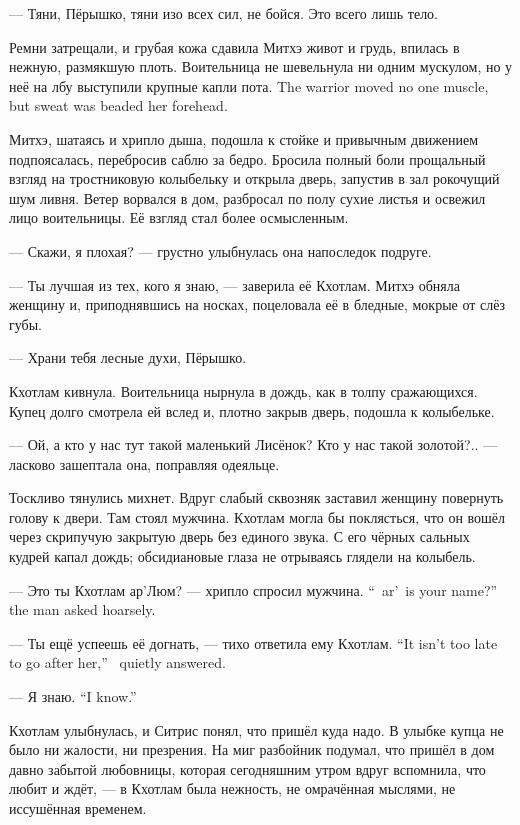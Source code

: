 --- Тяни, Пёрышко, тяни изо всех сил, не бойся.
Это всего лишь тело.

Ремни затрещали, и грубая кожа сдавила Митхэ живот и грудь, впилась в нежную, размякшую плоть.
{Воительница не шевельнула ни одним мускулом, но у неё на лбу выступили крупные капли пота.}
{The warrior moved no one muscle, but sweat was beaded her forehead.}

Митхэ, шатаясь и хрипло дыша, подошла к стойке и привычным движением подпоясалась, перебросив саблю за бедро.
Бросила полный боли прощальный взгляд на тростниковую колыбельку и открыла дверь, запустив в зал рокочущий шум ливня.
Ветер ворвался в дом, разбросал по полу сухие листья и освежил лицо воительницы.
Её взгляд стал более осмысленным.

--- Скажи, я плохая? --- грустно улыбнулась она напоследок подруге.

--- Ты лучшая из тех, кого я знаю, --- заверила её Кхотлам.
Митхэ обняла женщину и, приподнявшись на носках, поцеловала её в бледные, мокрые от слёз губы.

--- Храни тебя лесные духи, Пёрышко.

Кхотлам кивнула.
Воительница нырнула в дождь, как в толпу сражающихся.
Купец долго смотрела ей вслед и, плотно закрыв дверь, подошла к колыбельке.

--- Ой, а кто у нас тут такой маленький Лисёнок?
Кто у нас такой золотой?.. --- ласково зашептала она, поправляя одеяльце.

Тоскливо тянулись михнет.
Вдруг слабый сквозняк заставил женщину повернуть голову к двери.
Там стоял мужчина.
Кхотлам могла бы поклясться, что он вошёл через скрипучую закрытую дверь без единого звука.
С его чёрных сальных кудрей капал дождь;
обсидиановые глаза не отрываясь глядели на колыбель.

{--- Это ты Кхотлам ар'Люм? --- хрипло спросил мужчина.}
{``\Kchotlam\ ar'\Loem\ is your name?'' the man asked hoarsely.}

{--- Ты ещё успеешь её догнать, --- тихо ответила ему Кхотлам.}
{``It isn't too late to go after her,'' \Kchotlam\ quietly answered.}

{--- Я знаю.}
{``I know.''}

Кхотлам улыбнулась, и Ситрис понял, что пришёл куда надо.
В улыбке купца не было ни жалости, ни презрения.
На миг разбойник подумал, что пришёл в дом давно забытой любовницы, которая сегодняшним утром вдруг вспомнила, что любит и ждёт, --- в Кхотлам была нежность, не омрачённая мыслями, не иссушённая временем.


